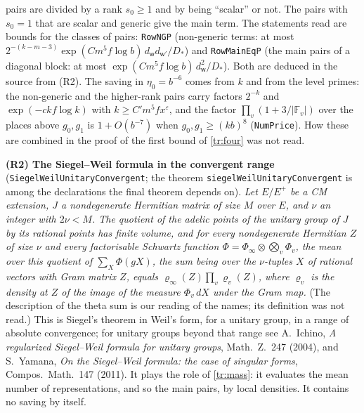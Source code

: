 \documentclass[11pt,letterpaper]{article}
\begin{document}
pairs are divided by a rank $s_0\ge1$ and by being ``scalar'' or not. The pairs with $s_0=1$ that are scalar
and generic give the main term. The statements read are bounds for the classes of pairs:
\texttt{RowNGP} (non-generic terms: at most
$2^{-(k-m-3)}\exp(Cm^5f\log b)\,d_{\mathsf w}d_{\mathsf w'}/D_*$) and \texttt{RowMainEqP} (the main pairs of a diagonal
block: at most $\exp(Cm^5f\log b)\,d_{\mathsf w}^2/D_*$). Both are deduced in the source from (R2). The saving in
$\eta_0=b^{-6}$ comes from $k$ and from the level primes: the non-generic and the higher-rank pairs carry
factors $2^{-k}$ and $\exp(-ckf\log k)$ with $k\ge C'm^5fx^\varepsilon$, and the factor
$\prod_v(1+3/|\mathbb F_v|)$ over the places above $g_0,g_1$ is $1+O(b^{-7})$ when $g_0,g_1\ge(kb)^8$
(\texttt{NumPrice}). How these are combined in the proof of the first bound of \eqref{tr:four} was not read.

\textbf{(R2) The Siegel--Weil formula in the convergent range} (\texttt{SiegelWeilUnitaryConvergent}; the theorem
\texttt{siegelWeilUnitaryConvergent} is among the declarations the final theorem depends on). \emph{Let $E/E^+$ be
a CM extension, $J$ a nondegenerate Hermitian matrix of size $M$ over $E$, and $\nu$ an integer with $2\nu<M$.
The quotient of the adelic points of the unitary group of $J$ by its rational points has finite volume, and
for every nondegenerate Hermitian $Z$ of size $\nu$ and every factorisable Schwartz function
$\Phi=\Phi_\infty\otimes\bigotimes_v\Phi_v$, the mean over this quotient of
$\sum_{X}\Phi(gX)$, the sum being over the $\nu$-tuples $X$ of rational vectors with Gram matrix $Z$, equals
$\varrho_\infty(Z)\prod_v\varrho_v(Z)$, where $\varrho_v$ is the density at $Z$ of the image of the measure $\Phi_v\,dX$ under the
Gram map.} (The description of the theta sum is our reading of the names; its definition was not read.)
This is Siegel's theorem in Weil's form, for a unitary group, in a range of absolute convergence; for
unitary groups beyond that range see A.~Ichino, \emph{A regularized Siegel--Weil formula for
unitary groups}, Math.\ Z.\ 247 (2004), and S.~Yamana, \emph{On the Siegel--Weil formula: the case of singular
forms}, Compos.\ Math.\ 147 (2011). It plays the role of \eqref{tr:mass}: it evaluates the mean number of
representations, and so the main pairs, by local densities. It contains no saving by itself.
\end{document}
